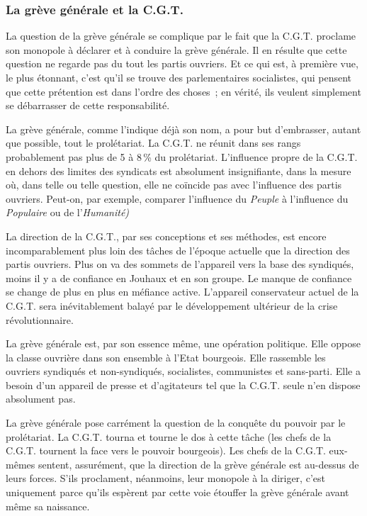 \documentclass[french,twoside]{book} %
\begin{document}
\subsubsection[{La grève générale et la C.G.T.}]{La grève générale et la C.G.T.}
\noindent La question de la grève générale se complique par le fait que la C.G.T. proclame son monopole à déclarer et à conduire la grève générale. Il en résulte que cette question ne regarde pas du tout les partis ouvriers. Et ce qui est, à première vue, le plus étonnant, c’est qu’il se trouve des parlementaires socialistes, qui pensent que cette prétention est dans l’ordre des choses ; en vérité, ils veulent simplement se débarrasser de cette responsabilité.\par
La grève générale, comme l’indique déjà son nom, a pour but d’embrasser, autant que possible, tout le prolétariat. La C.G.T. ne réunit dans ses rangs probablement pas plus de 5 à 8 \% du prolétariat. L’influence propre de la C.G.T. en dehors des limites des syndicats est absolument insignifiante, dans la mesure où, dans telle ou telle question, elle ne coïncide pas avec l’influence des partis ouvriers. Peut-on, par exemple, comparer l’influence du \emph{Peuple} à l’influence du \emph{Populaire} ou de l’\emph{Humanité)}\par
La direction de la C.G.T., par ses conceptions et ses méthodes, est encore incomparablement plus loin des tâches de l’époque actuelle que la direction des partis ouvriers. Plus on va des sommets de l’appareil vers la base des syndiqués, moins il y a de confiance en Jouhaux et en son groupe. Le manque de confiance se change de plus  en plus en méfiance active. L’appareil conservateur actuel de la C.G.T. sera inévitablement balayé par le développement ultérieur de la crise révolutionnaire.\par
La grève générale est, par son essence même, une opération politique. Elle oppose la classe ouvrière dans son ensemble à l’Etat bourgeois. Elle rassemble les ouvriers syndiqués et non-syndiqués, socialistes, communistes et sans-parti. Elle a besoin d’un appareil de presse et d’agitateurs tel que la C.G.T. seule n’en dispose absolument pas.\par
La grève générale pose carrément la question de la conquête du pouvoir par le prolétariat. La C.G.T. tourna et tourne le dos à cette tâche (les chefs de la C.G.T. tournent la face vers le pouvoir bourgeois). Les chefs de la C.G.T. eux-mêmes sentent, assurément, que la direction de la grève générale est au-dessus de leurs forces. S’ils proclament, néanmoins, leur monopole à la diriger, c’est uniquement parce qu’ils espèrent par cette voie étouffer la grève générale avant même sa naissance.\par
\end{document}
